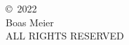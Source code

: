\thispagestyle{empty}
\vspace*{\fill}
\begin{center}
    \copyright\ 2022\\
    Boas Meier\\
    ALL RIGHTS RESERVED
\end{center}